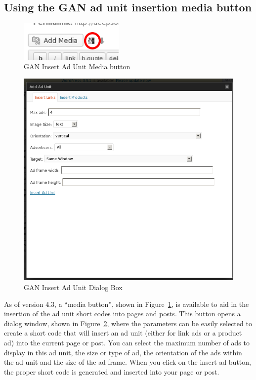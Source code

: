 \documentclass[letterpaper]{article}
\begin{document}
\subsection{Using the GAN ad unit insertion media button}

\begin{figure}[ht] 
\begin{centering}
\includegraphics[width=2in]{ganmediabutton.png} 
\caption{GAN Insert Ad Unit Media button} 
\label{fig:ganmediabutton} 
\end{centering}
\end{figure} 
\begin{figure}[ht] 
\begin{centering}
\includegraphics[width=4.5in]{ganinsertaddialog.png} 
\caption{GAN Insert Ad Unit Dialog Box} 
\label{fig:ganinsertaddialog}
\end{centering} 
\end{figure} 
As of version 4.3, a ``media button'', shown in
Figure~\ref{fig:ganmediabutton}, is available to aid in the insertion
of the ad unit short codes into pages and posts.  This button opens a
dialog window, shown in Figure~\ref{fig:ganinsertaddialog}, where the
parameters can be easily selected to create a short code that will
insert an ad unit (either for link ads or a product ad) into the
current page or post. You can select the maximum number of ads to
display in this ad unit, the size or type of ad, the orientation of the
ads within the ad unit and the size of the ad frame. When you click on
the insert ad button, the proper short code is generated and inserted
into your page or post.
\end{document}
